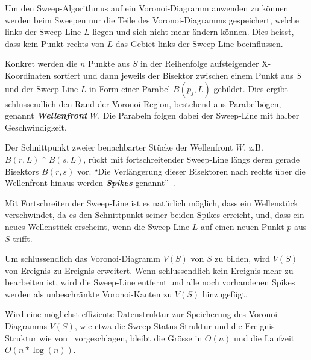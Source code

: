 Um den Sweep-Algorithmus auf ein Voronoi-Diagramm anwenden zu können werden beim Sweepen nur die Teile des Voronoi-Diagramms gespeichert, welche links der Sweep-Line $L$ liegen und sich nicht mehr ändern können. Dies heisst, dass kein Punkt rechts von $L$ das Gebiet links der Sweep-Line beeinflussen.

Konkret werden die $n$ Punkte aus $S$ in der Reihenfolge aufsteigender X-Koordinaten sortiert und dann jeweils der Bisektor zwischen einem Punkt aus $S$ und der Sweep-Line $L$ in Form einer Parabel $B(p_j, L)$ gebildet. Dies ergibt schlussendlich den Rand der Voronoi-Region, bestehend aus Parabelbögen, genannt \textit{\textbf{Wellenfront}} $W$. Die Parabeln folgen dabei der Sweep-Line mit halber Geschwindigkeit.

Der Schnittpunkt zweier benachbarter Stücke der Wellenfront $W$, z.B. $B(r, L) \cap B(s, L)$, rückt mit fortschreitender Sweep-Line längs deren gerade Bisektors $B(r, s)$ vor. ``Die Verlängerung dieser Bisektoren nach rechts über die Wellenfront hinaus werden \textbf{\textit{Spikes}} genannt''~\cite{klein2005algorithmischegeometrie}.

Mit Fortschreiten der Sweep-Line ist es natürlich möglich, dass ein Wellenstück verschwindet, da es den Schnittpunkt seiner beiden Spikes erreicht, und, dass ein neues Wellenstück erscheint, wenn die Sweep-Line $L$ auf einen neuen Punkt $p$ aus $S$ trifft.

Um schlussendlich das Voronoi-Diagramm $V(S)$ von $S$ zu bilden, wird $V(S)$ von Ereignis zu Ereignis erweitert. Wenn schlussendlich kein Ereignis mehr zu bearbeiten ist, wird die Sweep-Line entfernt und alle noch vorhandenen Spikes werden als unbeschränkte Voronoi-Kanten zu $V(S)$ hinzugefügt.

Wird eine möglichst effiziente Datenstruktur zur Speicherung des Voronoi-Diagramms $V(S)$, wie etwa die Sweep-Status-Struktur und die Ereignis-Struktur wie von~\cite{klein2005algorithmischegeometrie} vorgeschlagen, bleibt die Grösse in $O(n)$ und die Laufzeit $O(n * \log(n))$.


